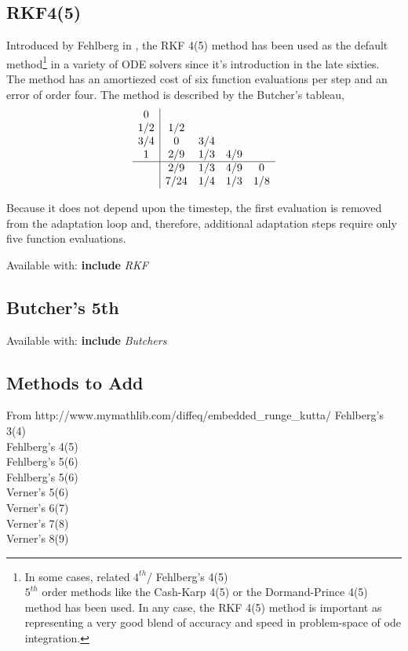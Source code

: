 \documentclass[letterpaper,10pt]{book}
\newcommand{\srcas}[1]{Available with: \textbf{include} \textlangle{}\textit{#1}\textrangle{}}
\begin{document}
      \subsection{RKF4(5)}
	Introduced by Fehlberg in \cite{fehlberg1969low}, the RKF 4(5) method has been used as the default method\footnote{In some cases, related $4^{th}$/    	Fehlberg's 4(5)\\$5^{th}$ order methods like the Cash-Karp 4(5) or the Dormand-Prince 4(5) method has been used.  In any case, the RKF 4(5) method is important as representing a very good blend of accuracy and speed in problem-space of ode integration.} in a variety of ODE solvers since it's introduction in the late sixties.  The method has an amortiezed cost of six function evaluations per step and an error of order four.  The method is described by the Butcher's tableau,
	\[
	  \begin{array}{c|cccc}
	    0 & & & &\\
	    1/2 & 1/2 & & &\\
	    3/4 & 0 & 3/4 & &\\	    
	    1 & 2/9 & 1/3 & 4/9 &\\	    
	    \hline
	    & 2/9 & 1/3 & 4/9 & 0\\
	    & 7/24 & 1/4 & 1/3 & 1/8\\
	  \end{array}
	\]
	
	Because it does not depend upon the timestep, the first evaluation is removed from the adaptation loop and, therefore, additional adaptation steps require only five function evaluations.
	
	\srcas{RKF}
    

      \subsection{Butcher's 5th}
	\srcas{Butchers}
    
    \subsection{Methods to Add}
    From http://www.mymathlib.com/diffeq/embedded_runge_kutta/
    	Fehlberg's 3(4)\\
    	Fehlberg's 4(5)\\
    	Fehlberg's 5(6)\\
    	Fehlberg's 5(6)\\  
    	
	Verner's 5(6)\\	
    	Verner's 6(7)\\
    	Verner's 7(8)\\
    	Verner's 8(9)\\  
\end{document}
